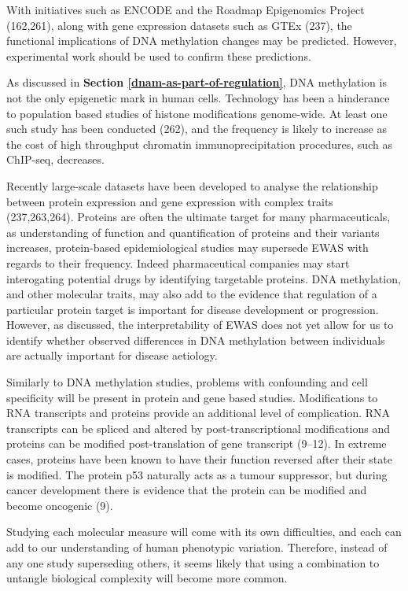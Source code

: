 \documentclass[11pt,oneside]{bristolthesis}
\begin{document}
With initiatives such as ENCODE and the Roadmap Epigenomics Project (162,261), along with gene expression datasets such as GTEx (237), the functional implications of DNA methylation changes may be predicted. However, experimental work should be used to confirm these predictions.

As discussed in \textbf{Section \ref{dnam-as-part-of-regulation}}, DNA methylation is not the only epigenetic mark in human cells. Technology has been a hinderance to population based studies of histone modifications genome-wide. At least one such study has been conducted (262), and the frequency is likely to increase as the cost of high throughput chromatin immunoprecipitation procedures, such as ChIP-seq, decreases.

Recently large-scale datasets have been developed to analyse the relationship between protein expression and gene expression with complex traits (237,263,264). Proteins are often the ultimate target for many pharmaceuticals, as understanding of function and quantification of proteins and their variants increases, protein-based epidemiological studies may supersede EWAS with regards to their frequency. Indeed pharmaceutical companies may start interogating potential drugs by identifying targetable proteins. DNA methylation, and other molecular traits, may also add to the evidence that regulation of a particular protein target is important for disease development or progression. However, as discussed, the interpretability of EWAS does not yet allow for us to identify whether observed differences in DNA methylation between individuals are actually important for disease aetiology.

Similarly to DNA methylation studies, problems with confounding and cell specificity will be present in protein and gene based studies. Modifications to RNA transcripts and proteins provide an additional level of complication. RNA transcripts can be spliced and altered by post-transcriptional modifications and proteins can be modified post-translation of gene transcript (9--12). In extreme cases, proteins have been known to have their function reversed after their state is modified. The protein p53 naturally acts as a tumour suppressor, but during cancer development there is evidence that the protein can be modified and become oncogenic (9).

Studying each molecular measure will come with its own difficulties, and each can add to our understanding of human phenotypic variation. Therefore, instead of any one study superseding others, it seems likely that using a combination to untangle biological complexity will become more common.
\end{document}
